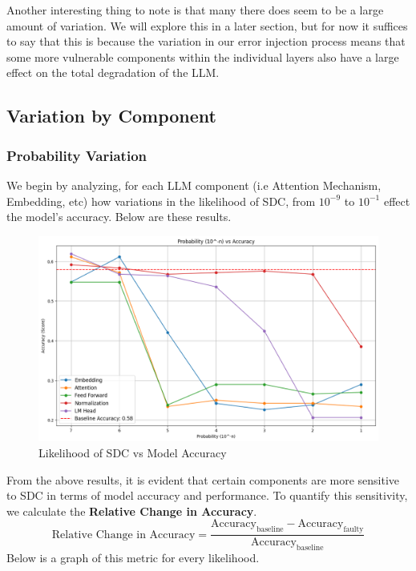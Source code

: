 Another interesting thing to note is that many there does seem to be a large amount of variation. We will explore this in a later section, but for now it suffices to say that this is because the variation in our error injection process
means that some more vulnerable components within the individual layers also have a large effect on the total degradation of the LLM.

\subsection{Variation by Component}
\subsubsection{Probability Variation}
We begin by analyzing, for each LLM component (i.e Attention Mechanism, Embedding, etc) how variations in the likelihood of SDC, from $10^{-9}$ to $10^{-1}$ effect the model's accuracy. Below are these results.

\begin{figure}[!htbp]
    \centering
    \includegraphics[width=1\linewidth]{images/component-accuracy.png}
    \caption{Likelihood of SDC vs Model Accuracy}
    \label{fig:varcomp}
\end{figure}

From the above results, it is evident that certain components are more sensitive to SDC in terms of model accuracy and performance. To quantify this sensitivity, we calculate the \textbf{Relative Change in Accuracy}. \[
\text{Relative Change in Accuracy} = \frac{\text{Accuracy}_{\text{baseline}} - \text{Accuracy}_{\text{faulty}}}{\text{Accuracy}_{\text{baseline}}}
\]
Below is a graph of this metric for every likelihood.


